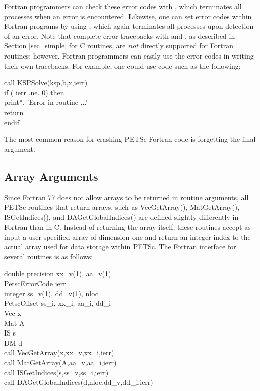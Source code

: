 Fortran programmers
can check these error codes with
, which terminates all processes when an error is
encountered.  Likewise, one can set error codes within Fortran programs by
using , which again terminates all processes
upon detection of an error.  
Note that complete error tracebacks with
 and , as described in Section
\ref{sec_simple} for C routines, are {\em not} directly supported for
Fortran routines; however, Fortran programmers can easily use the
error codes in writing their own tracebacks.  For example, one could
use code such as the following:
\begin{tabbing}
   call KSPSolve(ksp,b,x,ierr)\\
   if ( ierr .ne. 0) then\\
       print*, 'Error in routine ...'\\
       return\\
   endif
\end{tabbing}

The most common reason for crashing PETSc Fortran code is forgetting the 
final  argument.

\subsection{Array Arguments}
\label{sec_fortranarrays}

Since Fortran 77 does not allow arrays to be returned in routine
arguments, all PETSc routines that return arrays, such as 
VecGetArray(), MatGetArray(), 
ISGetIndices(), and DAGetGlobalIndices()
are defined slightly differently in Fortran than in C.  
Instead of returning the array itself, these routines
accept as input a user-specified array of dimension one and return an
integer index to the actual array used for data storage within PETSc.
The Fortran interface for several routines is as follows:
\begin{tabbing}
   double precision xx\_v(1), aa\_v(1)\\
   PetscErrorCode ierr\\
   integer          ss\_v(1), dd\_v(1), nloc\\
   PetscOffset      ss\_i, xx\_i, aa\_i, dd\_i\\
   Vec x\\
   Mat A\\
   IS  s\\
   DM  d \\
 
   call VecGetArray(x,xx\_v,xx\_i,ierr)\\
   call MatGetArray(A,aa\_v,aa\_i,ierr)\\
   call ISGetIndices(s,ss\_v,ss\_i,ierr)\\
   call DAGetGlobalIndices(d,nloc,dd\_v,dd\_i,ierr)
\end{tabbing}

